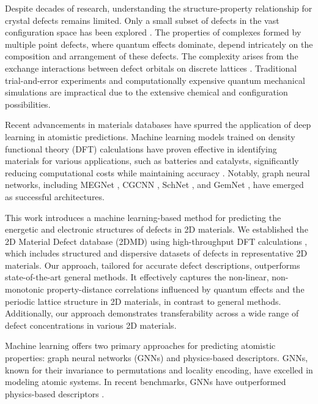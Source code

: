     Despite decades of research, understanding the structure-property relationship for crystal defects remains limited. Only a small subset of defects in the vast configuration space has been explored \cite{bertoldo2022quantum}. The properties of complexes formed by multiple point defects, where quantum effects dominate, depend intricately on the composition and arrangement of these defects. The complexity arises from the exchange interactions between defect orbitals on discrete lattices \cite{freysoldt2014first}. Traditional trial-and-error experiments and computationally expensive quantum mechanical simulations are impractical due to the extensive chemical and configuration possibilities.
    
    Recent advancements in materials databases have spurred the application of deep learning in atomistic predictions. Machine learning models trained on density functional theory (DFT) calculations have proven effective in identifying materials for various applications, such as batteries and catalysts, significantly reducing computational costs while maintaining accuracy \cite{smith2017ani, stocker2022robust}. Notably, graph neural networks, including MEGNet \cite{chen2019graph}, CGCNN \cite{xie2018crystal}, SchNet \cite{schutt2018schnet}, and GemNet \cite{GemNet}, have emerged as successful architectures.
    
    This work introduces a machine learning-based method for predicting the energetic and electronic structures of defects in 2D materials. We established the 2D Material Defect database (2DMD) using high-throughput DFT calculations \cite{defectsdataset}, which includes structured and dispersive datasets of defects in representative 2D materials. Our approach, tailored for accurate defect descriptions, outperforms state-of-the-art general methods. It effectively captures the non-linear, non-monotonic property-distance correlations influenced by quantum effects and the periodic lattice structure in 2D materials, in contrast to general methods. Additionally, our approach demonstrates transferability across a wide range of defect concentrations in various 2D materials.
    
    Machine learning offers two primary approaches for predicting atomistic properties: graph neural networks (GNNs) and physics-based descriptors. GNNs, known for their invariance to permutations and locality encoding, have excelled in modeling atomic systems. In recent benchmarks, GNNs have outperformed physics-based descriptors \cite{chanussot2021open}.
    
